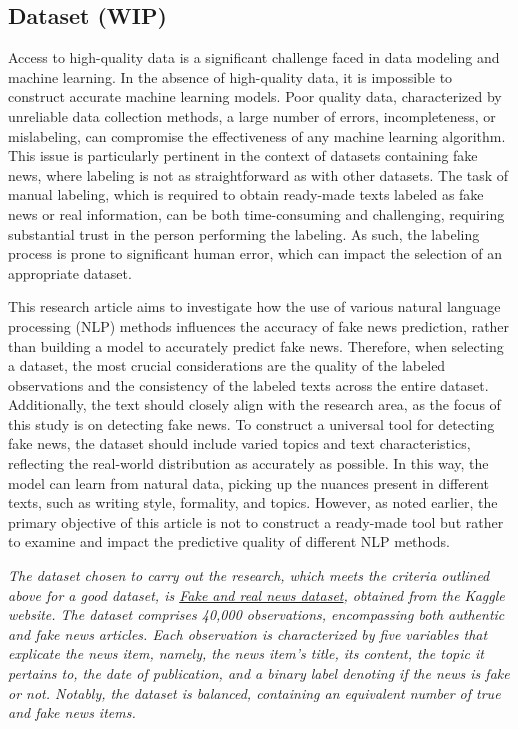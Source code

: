 \subsection{Dataset (WIP)}
Access to high-quality data is a significant challenge faced in data modeling and machine learning. In the absence of high-quality data, it is impossible to construct accurate machine learning models. Poor quality data, characterized by unreliable data collection methods, a large number of errors, incompleteness, or mislabeling, can compromise the effectiveness of any machine learning algorithm. This issue is particularly pertinent in the context of datasets containing fake news, where labeling is not as straightforward as with other datasets. The task of manual labeling, which is required to obtain ready-made texts labeled as fake news or real information, can be both time-consuming and challenging, requiring substantial trust in the person performing the labeling. As such, the labeling process is prone to significant human error, which can impact the selection of an appropriate dataset.

This research article aims to investigate how the use of various natural language processing (NLP) methods influences the accuracy of fake news prediction, rather than building a model to accurately predict fake news. Therefore, when selecting a dataset, the most crucial considerations are the quality of the labeled observations and the consistency of the labeled texts across the entire dataset. Additionally, the text should closely align with the research area, as the focus of this study is on detecting fake news. To construct a universal tool for detecting fake news, the dataset should include varied topics and text characteristics, reflecting the real-world distribution as accurately as possible. In this way, the model can learn from natural data, picking up the nuances present in different texts, such as writing style, formality, and topics. However, as noted earlier, the primary objective of this article is not to construct a ready-made tool but rather to examine and impact the predictive quality of different NLP methods. 

\textit{The dataset chosen to carry out the research, which meets the criteria outlined above for a good dataset, is \href{https://www.kaggle.com/datasets/clmentbisaillon/fake-and-real-news-dataset}{\textit{Fake and real news dataset}}, obtained from the Kaggle website. The dataset comprises 40,000 observations, encompassing both authentic and fake news articles. Each observation is characterized by five variables that explicate the news item, namely, the news item's title, its content, the topic it pertains to, the date of publication, and a binary label denoting if the news is fake or not. Notably, the dataset is balanced, containing an equivalent number of true and fake news items.}

